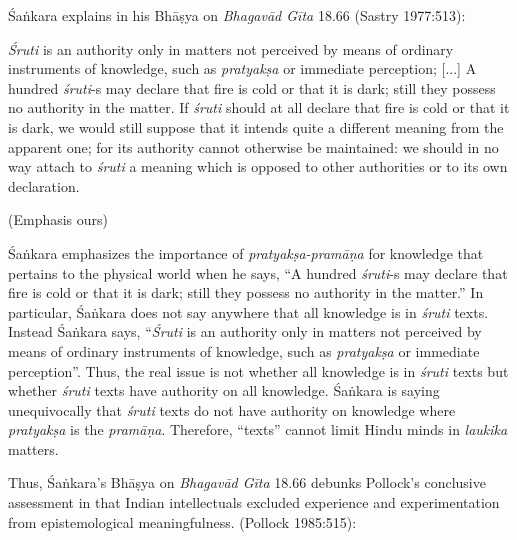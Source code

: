 Śaṅkara explains in his Bhāṣya on {\sl Bhagavād Gīta} 18.66 (Sastry 1977:513):
\begin{myquote}
{\sl Śruti} is an authority only in matters not perceived by means of ordinary instruments of knowledge, such as {\sl pratyakṣa} or immediate perception; [...] A hundred {\sl śruti}-s may declare that fire is cold or that it is dark; still they possess no authority in the matter. If {\sl śruti} should at all declare that fire is cold or that it is dark, we would still suppose that it intends quite a different meaning from the apparent one; for its authority cannot otherwise be maintained: we should in no way attach to {\sl śruti} a meaning which is opposed to other authorities or to its own declaration.

\hfill (Emphasis ours)
\end{myquote}

Śaṅkara emphasizes the importance of {\sl pratyakṣa-pramāṇa} for knowledge that pertains to the physical world when he says, ``A hundred {\sl śruti}-s may declare that fire is cold or that it is dark; still they possess no authority in the matter.''  In particular, Śaṅkara does not say anywhere that all knowledge is in {\sl śruti} texts. Instead Śaṅkara says, ``{\sl Śruti} is an authority only in matters not perceived by means of ordinary instruments of knowledge, such as {\sl pratyakṣa} or immediate perception''. Thus, the real issue is not whether all knowledge is in {\sl śruti} texts but whether {\sl śruti} texts have authority on all knowledge.  Śaṅkara is saying unequivocally that {\sl śruti} texts do not have authority on knowledge where {\sl pratyakṣa} is the {\sl pramāṇa}. Therefore, ``texts'' cannot limit Hindu minds in {\sl laukika} matters.

Thus, Śaṅkara's Bhāṣya on {\sl Bhagavād Gīta} 18.66 debunks Pollock's conclusive assessment in that Indian intellectuals excluded experience and experimentation from epistemological meaningfulness. (Pollock 1985:515):

